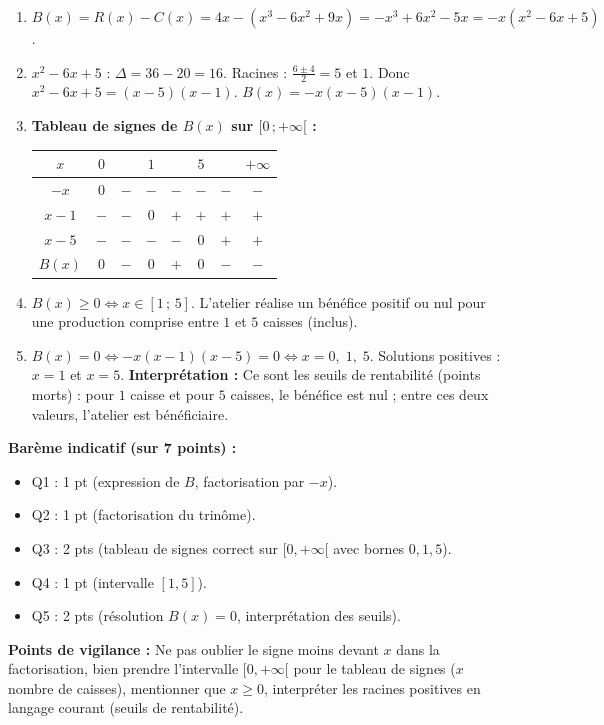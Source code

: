 \documentclass[11pt]{article}
\newcommand{\cle}[1]{{\popxbold\color{popdark}#1}}
\begin{document}
\begin{corrige}
\begin{enumerate}
\item $B(x)=R(x)-C(x)=4x-(x^3-6x^2+9x) = -x^3+6x^2-5x = -x(x^2-6x+5)$.
\item $x^2-6x+5$ : $\Delta=36-20=16$. Racines : $\frac{6\pm4}{2}=5$ et $1$. Donc $x^2-6x+5=(x-5)(x-1)$.
$B(x) = -x(x-5)(x-1)$.
\item \textbf{Tableau de signes de $B(x)$ sur $[0\,;+\infty[$ :}
\begin{center}
\begin{tabular}{|c|ccccccc|}\hline
$x$ & $0$ & & $1$ & & $5$ & & $+\infty$ \\ \hline
$-x$ & $0$ & $-$ & $-$ & $-$ & $-$ & $-$ & $-$ \\
$x-1$ & $-$ & $-$ & $0$ & $+$ & $+$ & $+$ & $+$ \\
$x-5$ & $-$ & $-$ & $-$ & $-$ & $0$ & $+$ & $+$ \\ \hline
$B(x)$ & $0$ & $-$ & $0$ & $+$ & $0$ & $-$ & $-$ \\ \hline
\end{tabular}
\end{center}
\item $B(x) \ge 0 \iff x \in \boxed{[1\,;\,5]}$. L'atelier réalise un bénéfice positif ou nul pour une production comprise entre $1$ et $5$ caisses (inclus).
\item $B(x)=0 \iff -x(x-1)(x-5)=0 \iff x=0,\;1,\;5$.
Solutions positives : $x=1$ et $x=5$. \textbf{Interprétation :} Ce sont les \cle{seuils de rentabilité} (points morts) : pour $1$ caisse et pour $5$ caisses, le bénéfice est nul ; entre ces deux valeurs, l'atelier est bénéficiaire.
\end{enumerate}
\textbf{Barème indicatif (sur 7 points) :}
\begin{itemize}
\item Q1 : 1 pt (expression de $B$, factorisation par $-x$).
\item Q2 : 1 pt (factorisation du trinôme).
\item Q3 : 2 pts (tableau de signes correct sur $[0,+\infty[$ avec bornes $0,1,5$).
\item Q4 : 1 pt (intervalle $[1,5]$).
\item Q5 : 2 pts (résolution $B(x)=0$, interprétation des seuils).
\end{itemize}
\textbf{Points de vigilance :} Ne pas oublier le signe moins devant $x$ dans la factorisation, bien prendre l'intervalle $[0,+\infty[$ pour le tableau de signes ($x$ nombre de caisses), mentionner que $x\ge0$, interpréter les racines positives en langage courant (seuils de rentabilité).
\end{corrige}
\end{document}
